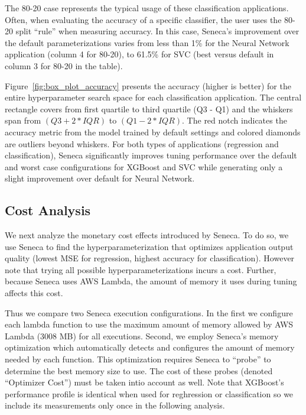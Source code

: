 The 80-20 case represents the typical usage of these classification
applications.  Often, when evaluating the accuracy of a specific classifier,
the user uses the 80-20 split ``rule'' when measuring accuracy.  In this case,
Seneca's improvement over the default parameterizations varies from less than
1\% for the Neural Network application (column 4 for 80-20), to 61.5\% for SVC
(best versus default in column 3 for 80-20 in the table). 

Figure~\ref{fig:box_plot_accuracy} presents the accuracy (higher is better) 
for the entire hyperparameter search space for each classification
application.  The central rectangle covers from first quartile to third quartile (Q3 - Q1) and the whiskers span from \texttt{$(Q3 + 2 * IQR)$} to \texttt{$(Q1 - 2 * IQR)$}. The red notch indicates the accuracy metric from the model trained by default settings and colored diamonds are outliers beyond whiskers.
For both types of applications (regression and classification), Seneca significantly
improves tuning performance over the default and worst case configurations for 
XGBoost and SVC while generating only a slight improvement over default for
Neural Network.

\subsection{Cost Analysis}

We next analyze the monetary cost effects introduced by Seneca.  To do so, we
use Seneca to find the hyperparameterization that optimizes application output
quality (lowest MSE for regression, highest accuracy for classification).
However note that trying all possible hyperparameterizations incurs a cost.
Further, because Seneca uses AWS Lambda, the amount of memory it uses during
tuning affects this cost. 

Thus we compare two Seneca execution configurations.  In the first
we configure each lambda function to
use the maximum amount of memory allowed by AWS Lambda (3008 MB) for all
executions.
Second, we
employ Seneca's memory optimization which automatically detects and configures
the amount of memory needed by each function.  This optimization requires
Seneca to ``probe'' to determine the best memory size to use.  The
cost of these probes
(denoted ``Optimizer Cost'') must be taken intio account as well.
Note that XGBoost's performance profile is identical when used for reghression
or classification so we include its measurements only once in the following
analysis.

